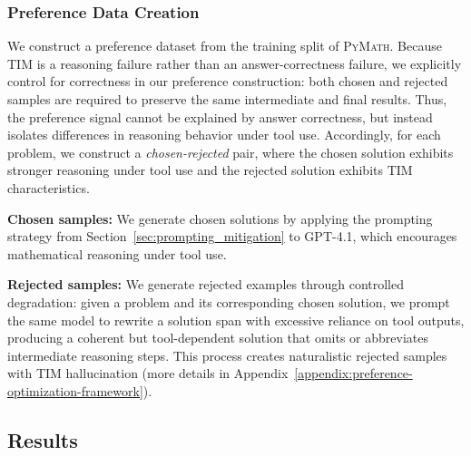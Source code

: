 \documentclass[11pt]{article}
\def \dataset{\textsc{PyMath}\xspace}
\def \task{\textsc{TIM}\xspace}
\begin{document}
\subsubsection{Preference Data Creation}
\label{sec:data_collection}

We construct a preference dataset from the training split of \dataset{}. Because \task{} is a reasoning failure rather than an answer-correctness failure, we explicitly control for correctness in our preference construction: both chosen and rejected samples are required to preserve the same intermediate and final results. Thus, the preference signal cannot be explained by answer correctness, but instead isolates differences in reasoning behavior under tool use. Accordingly, for each problem, we construct a \textit{chosen-rejected} pair, where the chosen solution exhibits stronger reasoning under tool use and the rejected solution exhibits \task{} characteristics.

\noindent
\textbf{Chosen samples:} We generate chosen solutions by applying the prompting strategy from Section~\ref{sec:prompting_mitigation} to GPT-4.1, which encourages mathematical reasoning under tool use.

\noindent
\textbf{Rejected samples:} We generate rejected examples through controlled degradation: given a problem and its corresponding chosen solution,
we prompt the same model to rewrite a solution span with excessive reliance on tool outputs, producing a coherent but tool-dependent solution that omits or abbreviates intermediate reasoning steps.
This process creates naturalistic rejected samples with \task{} hallucination 
(more details in Appendix~\ref{appendix:preference-optimization-framework}). 

\subsection{Results}
\end{document}
